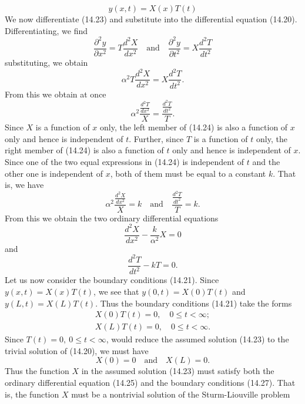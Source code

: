 \documentclass[11pt,a4paper, twoside]{report}
\begin{document}
	\begin{equation}\tag{14.23}\label{14.23}
		y(x, t) = X(x)T(t)
	\end{equation}
	We now differentiate (14.23) and substitute into the differential equation (14.20). Differentiating, we find
	$$
	\frac{\partial^2 y}{\partial x^2} = T\frac{d^2 X}{dx^2}\quad \text{and}\quad \frac{\partial^2 y}{\partial t^2} = X\frac{d^2 T}{dt^2}
	$$
	substituting, we obtain
	$$
	\alpha^2 T\frac{d^2 X}{dx^2} = X \frac{d^2 T}{dt^2}.
	$$
	From this we obtain at once
	\begin{equation}\tag{14.24}\label{14.24}
		\alpha^2 \frac{\frac{d^2 T}{dx^2}}{X} = \frac{\frac{d^2T}{dt^2}}{T}.
	\end{equation}
	Since $X$ is a function of $x$ only, the left member of (14.24) is also a function of $x$ only and hence is independent of $t$. Further, since $T$ is a function of $t$ only, the right member of (14.24) is also a function of $t$ only and hence is independent of $x$. Since one of the two equal expressions in (14.24) is independent of $t$ and the other one is independent of $x$, both of them must be equal to a constant $k$. That is, we have
	$$
	\alpha^2 \frac{\frac{d^2 X}{dx^2}}{X} = k\quad \text{and}\quad \frac{\frac{d^2T}{dt^2}}{T} = k.
	$$
	From this we obtain the two ordinary differential equations
	\begin{equation}\tag{14.25}\label{14.25}
		\frac{d^2 X}{dx^2} - \frac{k}{\alpha^2}X = 0
	\end{equation}
	and
	\begin{equation}\tag{14.26}\label{14.26}
		\frac{d^2 T}{dt^2} - kT = 0.
	\end{equation}
	Let us now consider the boundary conditions (14.21). Since $y(x, t) = X(x)T(t)$, we see that $y(0, t) = X(0)T(t)$ and $y(L, t) = X(L)T(t)$. Thus the boundary conditions (14.21) take the forms
	\begin{equation*}
		\begin{aligned}
			X(0)T(t) = 0,\quad 0 \leq t < \infty;\\
			X(L)T(t) = 0, \quad 0 \leq t < \infty.
		\end{aligned}
	\end{equation*}
	Since $T(t) = 0,\ 0 \leq t < \infty$, would reduce the assumed solution (14.23) to the trivial solution of (14.20), we must have
	\begin{equation}\tag{14.27}\label{14.27}
		X(0) = 0\quad \text{and}\quad X(L) = 0.
	\end{equation}
	Thus the function $X$ in the assumed solution (14.23) must satisfy both the ordinary differential equation (14.25) and the boundary conditions (14.27). That is, the function $X$ must be a nontrivial solution of the Sturm-Liouville problem
\end{document}
